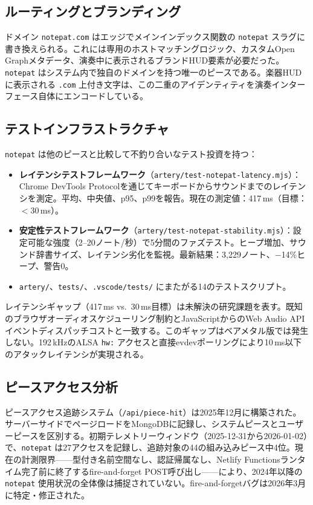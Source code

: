 \documentclass[10pt,letterpaper,twocolumn]{article}
\begin{document}
\subsection{ルーティングとブランディング}

ドメイン \texttt{notepat.com} はエッジでメインインデックス関数の \texttt{notepat} スラグに書き換えられる。これには専用のホストマッチングロジック、カスタムOpen Graphメタデータ、演奏中に表示されるブランドHUD要素が必要だった。\texttt{notepat} はシステム内で独自のドメインを持つ唯一のピースである。楽器HUDに表示される \texttt{.com} 上付き文字は、この二重のアイデンティティを演奏インターフェース自体にエンコードしている。

\subsection{テストインフラストラクチャ}

\texttt{notepat} は他のピースと比較して不釣り合いなテスト投資を持つ：

\begin{itemize}
  \item \textbf{レイテンシテストフレームワーク}（\texttt{artery/test-notepat-latency.mjs}）：Chrome DevTools Protocolを通じてキーボードからサウンドまでのレイテンシを測定。平均、中央値、p95、p99を報告。現在の測定値：417\,ms（目標：$<$30\,ms）。
  \item \textbf{安定性テストフレームワーク}（\texttt{artery/test-notepat-stability.mjs}）：設定可能な強度（2--20ノート/秒）で5分間のファズテスト。ヒープ増加、サウンド辞書サイズ、レイテンシ劣化を監視。最新結果：3,229ノート、$-$14\%ヒープ、警告0。
  \item \texttt{artery/}、\texttt{tests/}、\texttt{.vscode/tests/} にまたがる14のテストスクリプト。
\end{itemize}

レイテンシギャップ（417\,ms vs.\ 30\,ms目標）は未解決の研究課題を表す。既知のブラウザオーディオスケジューリング制約とJavaScriptからのWeb Audio APIイベントディスパッチコストと一致する。このギャップはベアメタル版では発生しない。192\,kHzのALSA \texttt{hw:} アクセスと直接evdevポーリングにより10\,ms以下のアタックレイテンシが実現される。

\subsection{ピースアクセス分析}

ピースアクセス追跡システム（\texttt{/api/piece-hit}）は2025年12月に構築された。サーバーサイドでページロードをMongoDBに記録し、システムピースとユーザーピースを区別する。初期テレメトリーウィンドウ（2025-12-31から2026-01-02）で、\texttt{notepat} は27アクセスを記録し、追跡対象の44の組み込みピース中4位。現在の計測限界——型付き名前空間なし、認証帰属なし、Netlify Functionsランタイム完了前に終了するfire-and-forget POST呼び出し——により、2024年以降の \texttt{notepat} 使用状況の全体像は捕捉されていない。fire-and-forgetバグは2026年3月に特定・修正された。
\end{document}
